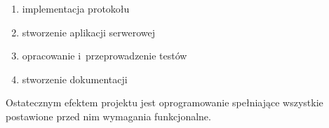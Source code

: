 \begin{enumerate}
    \item implementacja protokołu
    \item stworzenie aplikacji serwerowej
    \item opracowanie i~przeprowadzenie testów
    \item stworzenie dokumentacji
\end{enumerate}

Ostatecznym efektem projektu jest oprogramowanie spełniające wszystkie postawione przed nim wymagania funkcjonalne. 